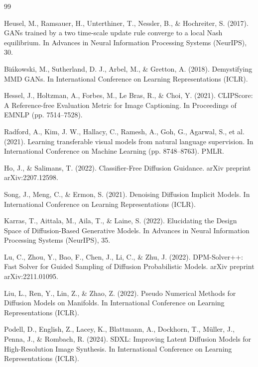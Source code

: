 \documentclass[11pt]{article}
\begin{document}
\begin{thebibliography}{99}

 Heusel, M., Ramsauer, H., Unterthiner, T., Nessler, B., \& Hochreiter, S. (2017). GANs trained by a two time-scale update rule converge to a local Nash equilibrium. In Advances in Neural Information Processing Systems (NeurIPS), 30.

 Bi\'nkowski, M., Sutherland, D. J., Arbel, M., \& Gretton, A. (2018). Demystifying MMD GANs. In International Conference on Learning Representations (ICLR).

 Hessel, J., Holtzman, A., Forbes, M., Le Bras, R., \& Choi, Y. (2021). CLIPScore: A Reference-free Evaluation Metric for Image Captioning. In Proceedings of EMNLP (pp. 7514--7528).

 Radford, A., Kim, J. W., Hallacy, C., Ramesh, A., Goh, G., Agarwal, S., et al. (2021). Learning transferable visual models from natural language supervision. In International Conference on Machine Learning (pp. 8748--8763). PMLR.

 Ho, J., \& Salimans, T. (2022). Classifier-Free Diffusion Guidance. arXiv preprint arXiv:2207.12598.

 Song, J., Meng, C., \& Ermon, S. (2021). Denoising Diffusion Implicit Models. In International Conference on Learning Representations (ICLR).

 Karras, T., Aittala, M., Aila, T., \& Laine, S. (2022). Elucidating the Design Space of Diffusion-Based Generative Models. In Advances in Neural Information Processing Systems (NeurIPS), 35.

 Lu, C., Zhou, Y., Bao, F., Chen, J., Li, C., \& Zhu, J. (2022). DPM-Solver++: Fast Solver for Guided Sampling of Diffusion Probabilistic Models. arXiv preprint arXiv:2211.01095.

 Liu, L., Ren, Y., Lin, Z., \& Zhao, Z. (2022). Pseudo Numerical Methods for Diffusion Models on Manifolds. In International Conference on Learning Representations (ICLR).

 Podell, D., English, Z., Lacey, K., Blattmann, A., Dockhorn, T., M\"uller, J., Penna, J., \& Rombach, R. (2024). SDXL: Improving Latent Diffusion Models for High-Resolution Image Synthesis. In International Conference on Learning Representations (ICLR).

\end{thebibliography}
\end{document}
